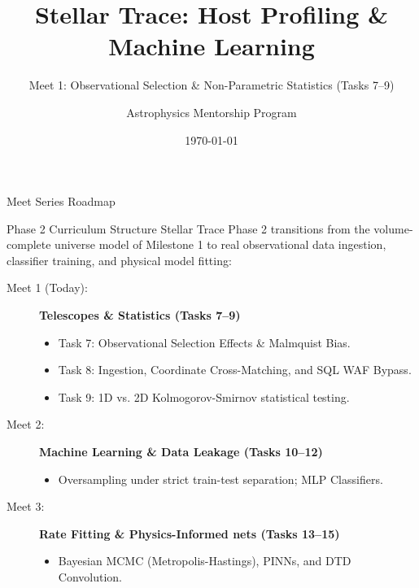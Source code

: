 \documentclass[9pt]{beamer}
\title{Stellar Trace: Host Profiling \& Machine Learning}
\subtitle{Meet 1: Observational Selection \& Non-Parametric Statistics (Tasks 7--9)}
\author{Astrophysics Mentorship Program}
\date{\today}
\begin{document}
\maketitle

\begin{frame}{Meet Series Roadmap}
  \begin{block}{Phase 2 Curriculum Structure}
    Stellar Trace Phase 2 transitions from the volume-complete universe model of Milestone 1 to real observational data ingestion, classifier training, and physical model fitting:
  \end{block}
  \begin{description}
    \item[Meet 1 (Today):] \textbf{Telescopes \& Statistics (Tasks 7--9)}
      \begin{itemize}
        \item Task 7: Observational Selection Effects \& Malmquist Bias.
        \item Task 8: Ingestion, Coordinate Cross-Matching, and SQL WAF Bypass.
        \item Task 9: 1D vs. 2D Kolmogorov-Smirnov statistical testing.
      \end{itemize}
    \item[Meet 2:] \textbf{Machine Learning \& Data Leakage (Tasks 10--12)}
      \begin{itemize}
        \item Oversampling under strict train-test separation; MLP Classifiers.
      \end{itemize}
    \item[Meet 3:] \textbf{Rate Fitting \& Physics-Informed nets (Tasks 13--15)}
      \begin{itemize}
        \item Bayesian MCMC (Metropolis-Hastings), PINNs, and DTD Convolution.
      \end{itemize}
  \end{description}
\end{frame}
\end{document}
